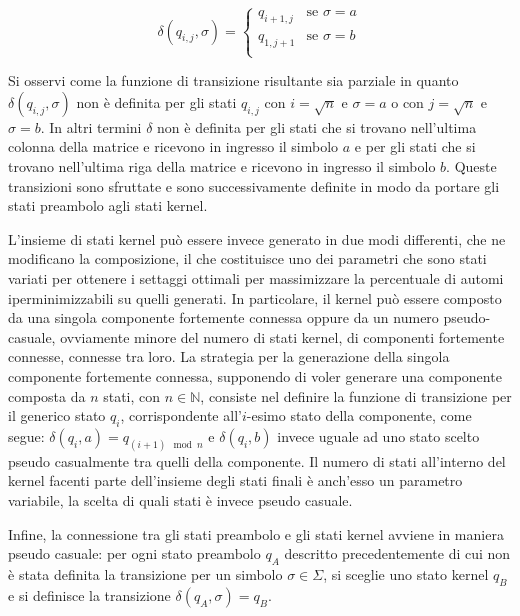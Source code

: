 \documentclass[a4paper,12pt,twoside, openright]{report} %
\begin{document}
\begin{equation*}
  \delta(q_{i,j}, \sigma) =
  \begin{cases}
    q_{i+1,j} & \text{se } \sigma = a \\
    q_{1,j+1} & \text{se } \sigma = b \\
  \end{cases}
\end{equation*}

Si osservi come la funzione di transizione risultante sia parziale in quanto $\delta(q_{i,j}, \sigma)$
non è definita per gli stati $q_{i,j}$ con $i = \sqrt{n}$ e $\sigma = a$ o con $j = \sqrt{n}$ e $\sigma = b$.
In altri termini $\delta$ non è definita per gli stati che si trovano nell'ultima colonna della matrice e ricevono
in ingresso il simbolo $a$ e per gli stati che si trovano nell'ultima riga della matrice e ricevono in ingresso
il simbolo $b$. Queste transizioni sono sfruttate e sono successivamente definite in modo da 
portare gli stati preambolo agli stati kernel.

L'insieme di stati kernel può essere invece generato in due modi differenti, che ne modificano la composizione,
il che costituisce uno dei parametri che sono stati variati per ottenere i settaggi ottimali per massimizzare
la percentuale di automi iperminimizzabili su quelli generati. In particolare, il kernel può essere composto da
una singola componente fortemente connessa oppure da un numero pseudo-casuale, ovviamente minore del numero
di stati kernel, di componenti fortemente connesse, connesse tra loro.
La strategia per la generazione della singola componente fortemente connessa, supponendo di voler generare una
componente composta da $n$ stati, con $n \in \mathbb{N}$, consiste nel definire la 
funzione di transizione per il generico stato $q_i$, corrispondente all'$i$-esimo stato della componente, come
segue: $\delta(q_i, a) = q_{(i+1) \!\! \mod n}$ e $\delta(q_i, b)$ invece uguale ad uno stato scelto pseudo
casualmente tra quelli della componente. Il numero di stati all'interno del kernel facenti parte dell'insieme degli
stati finali è anch'esso un parametro variabile, la scelta di quali stati è invece pseudo casuale.

Infine, la connessione tra gli stati preambolo e gli stati kernel avviene in maniera pseudo casuale: per ogni
stato preambolo $q_A$ descritto precedentemente di cui non è stata definita la transizione per un simbolo
$\sigma \in \Sigma$, si sceglie uno stato kernel $q_B$ e si definisce la transizione $\delta(q_A, \sigma) = q_B$.
\end{document}
